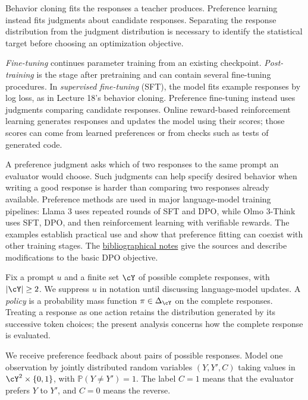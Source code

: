 \documentclass[11pt,twoside]{article}
\renewcommand{\P}{\mathbb P}
\theoremstyle{definition}
\theoremstyle{remark}
\begin{document}
Behavior cloning fits the responses a teacher produces. Preference learning
instead fits judgments about candidate responses. Separating the response
distribution from the judgment distribution is necessary to identify the
statistical target before choosing an optimization objective.

\emph{Fine-tuning} continues parameter training from an existing checkpoint.
\emph{Post-training} is the stage after pretraining and can contain several
fine-tuning procedures. In \emph{supervised fine-tuning} (SFT), the model fits
example responses by log loss, as in Lecture 18's behavior cloning.
Preference fine-tuning instead uses judgments comparing candidate responses.
Online reward-based reinforcement learning generates responses and updates
the model using their scores; those scores can come from learned preferences
or from checks such as tests of generated code.

A preference judgment asks which of two responses to the same prompt an
evaluator would choose. Such judgments can help specify desired behavior
when writing a good response is harder than comparing two responses already
available. Preference methods are used in major language-model training
pipelines: Llama 3 uses repeated rounds of SFT and DPO, while Olmo 3-Think
uses SFT, DPO, and then reinforcement learning with verifiable rewards.
The examples establish practical use and show that preference fitting can
coexist with other training stages. The
\hyperref[sec:bibliographical-notes]{bibliographical notes} give the sources
and describe modifications to the basic DPO objective.

Fix a prompt $u$ and a finite set $\cY$ of possible complete responses,
with $|\cY|\ge2$. We suppress $u$ in notation until discussing language-model
updates. A \emph{policy} is a probability mass function
$\pi\in\Delta_{\cY}$ on the complete responses. Treating a response as one
action retains the distribution generated by its successive token choices;
the present analysis concerns how the complete response is evaluated.

We receive preference feedback about pairs of possible responses. Model one
observation by jointly distributed random variables $(Y,Y',C)$ taking values
in $\cY^2\times\{0,1\}$, with $\P(Y\ne Y')=1$. The label $C=1$ means
that the evaluator prefers $Y$ to $Y'$, and $C=0$ means the reverse.
\end{document}
